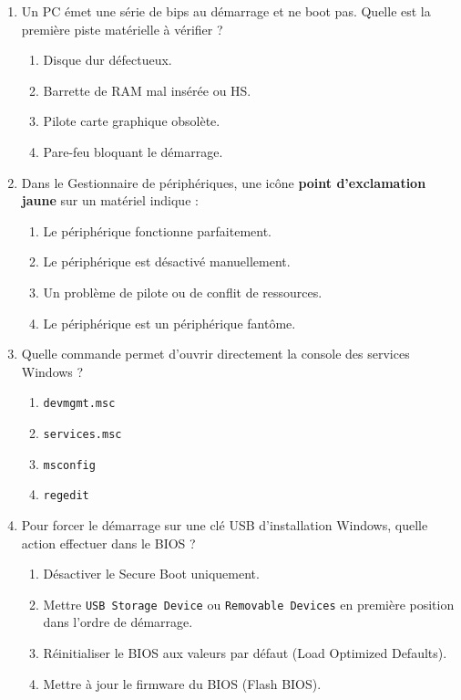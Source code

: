 \documentclass[11pt]{article}
\begin{document}
\begin{exercice}
\begin{enumerate}
    \item Un PC émet une série de bips au démarrage et ne boot pas. Quelle est la première piste matérielle à vérifier ?
    \begin{enumerate}
        \item Disque dur défectueux.
        \item Barrette de RAM mal insérée ou HS.
        \item Pilote carte graphique obsolète.
        \item Pare-feu bloquant le démarrage.
    \end{enumerate}
    \item Dans le Gestionnaire de périphériques, une icône \textbf{point d'exclamation jaune} sur un matériel indique :
    \begin{enumerate}
        \item Le périphérique fonctionne parfaitement.
        \item Le périphérique est désactivé manuellement.
        \item Un problème de pilote ou de conflit de ressources.
        \item Le périphérique est un périphérique fantôme.
    \end{enumerate}
    \item Quelle commande permet d'ouvrir directement la console des services Windows ?
    \begin{enumerate}
        \item \texttt{devmgmt.msc}
        \item \texttt{services.msc}
        \item \texttt{msconfig}
        \item \texttt{regedit}
    \end{enumerate}
    \item Pour forcer le démarrage sur une clé USB d'installation Windows, quelle action effectuer dans le BIOS ?
    \begin{enumerate}
        \item Désactiver le Secure Boot uniquement.
        \item Mettre \texttt{USB Storage Device} ou \texttt{Removable Devices} en première position dans l'ordre de démarrage.
        \item Réinitialiser le BIOS aux valeurs par défaut (Load Optimized Defaults).
        \item Mettre à jour le firmware du BIOS (Flash BIOS).
    \end{enumerate}
\end{enumerate}
\end{exercice}
\end{document}

